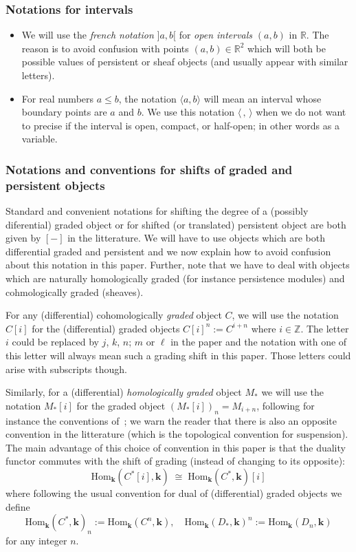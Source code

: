 \documentclass[a4paper, english, 11pt]{article}
\newcommand{\kk}[0]{\textbf{k}}
\newcommand{\0}{\vec{0}}
\newcommand{\R}[0]{\mathbb{R}}
\newcommand{\Z}[0]{\mathbb{Z}}
\newcommand{\Hom}[0]{\text{Hom}}
\begin{document}
\subsubsection{Notations for  intervals} 
\begin{itemize} \item We will use the \emph{french notation} $]a,b[$ for \emph{open intervals} $(a,b)$ in $\R$. The reason is to avoid confusion with points $(a,b)\in \R^2$ which will both be possible values of persistent or sheaf objects (and usually appear with similar letters).
    
\item For real numbers $a\leq b$, the notation $\langle a, b\rangle$ will mean an  interval whose boundary points are $a$ and $b$. We use this notation $\langle\, , \,  \rangle$  when we do not want to precise if the interval is open, compact, or half-open; in other words as a variable.
    \end{itemize}
\subsubsection{Notations  and conventions for shifts of graded and persistent objects}   
Standard and convenient notations for shifting the degree of a (possibly diferential) graded object or for  shifted (or translated) persistent object are both given by  $[-]$ in the litterature. We will have to use objects which are both differential graded and persistent and we now explain how to avoid confusion about this notation in this paper. Further, note that we have to deal with objects which are naturally homologically graded (for instance persistence modules) and cohmologically graded (sheaves).

For any (differential) cohomologically \emph{graded} object $C$, we will use the notation $C[i]$ for the (differential) graded objects $C[i]^n:= C^{i+n}$ where $i\in \Z$. The letter $i$ could be replaced by $j$, $k$, $n$; $m$ or $\ell$ in the paper and the notation with one of this letter will always mean such a grading shift  in this paper. Those letters could arise with subscripts though. 

\smallskip

Similarly, for a (differential) \emph{homologically graded} object $M_*$ we will use the notation $M_*[i]$ for the graded object $(M_*[i])_n= M_{i+n}$, following for instance the conventions of~\cite[Section 12.13]{stacks-project}; we warn the reader that there is also  an opposite convention in the litterature (which is the topological convention for suspension). The main advantage of this choice of convention in this paper is that the duality functor commutes with the shift of grading (instead of changing to its opposite):
$$\Hom_{\kk}(C^*[i], \kk) \; \cong \; \Hom_{\kk}( C^*, \kk) [i] $$
where following the usual convention for dual of (differential) graded objects  we define $$\Hom_{\kk}(C^*,\kk)_n := \Hom_{\kk}(C^n, \kk), \quad \Hom_{\kk}(D_*,\kk)^n := \Hom_{\kk}(D_n, \kk)$$ for any integer $n$.
\end{document}
